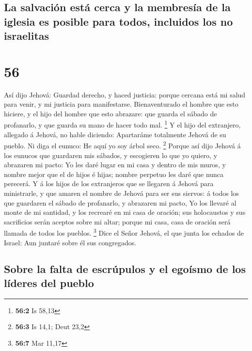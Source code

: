 \hypertarget{la-salvaciuxf3n-estuxe1-cerca-y-la-membresuxeda-de-la-iglesia-es-posible-para-todos-incluidos-los-no-israelitas}{%
\subsection{La salvación está cerca y la membresía de la iglesia es
posible para todos, incluidos los no
israelitas}\label{la-salvaciuxf3n-estuxe1-cerca-y-la-membresuxeda-de-la-iglesia-es-posible-para-todos-incluidos-los-no-israelitas}}

\hypertarget{section-55}{%
\section{56}\label{section-55}}

 Así dijo Jehová: Guardad derecho, y haced justicia:
porque cercana está mi salud para venir, y mi justicia para
manifestarse.  Bienaventurado el hombre que esto hiciere,
y el hijo del hombre que esto abrazare: que guarda el sábado de
profanarlo, y que guarda su mano de hacer todo mal. \footnote{\textbf{56:2}
  Is 58,13}  Y el hijo del extranjero, allegado á Jehová,
no hable diciendo: Apartaráme totalmente Jehová de su pueblo. Ni diga el
eunuco: He aquí yo soy árbol seco. \footnote{\textbf{56:3} Is 14,1; Deut
  23,2}  Porque así dijo Jehová á los eunucos que
guardaren mis sábados, y escogieren lo que yo quiero, y abrazaren mi
pacto:  Yo les daré lugar en mi casa y dentro de mis
muros, y nombre mejor que el de hijos é hijas; nombre perpetuo les daré
que nunca perecerá.  Y á los hijos de los extranjeros que
se llegaren á Jehová para ministrarle, y que amaren el nombre de Jehová
para ser sus siervos: á todos los que guardaren el sábado de profanarlo,
y abrazaren mi pacto,  Yo los llevaré al monte de mi
santidad, y los recrearé en mi casa de oración; sus holocaustos y sus
sacrificios serán aceptos sobre mi altar; porque mi casa, casa de
oración será llamada de todos los pueblos. \footnote{\textbf{56:7} Mar
  11,17}  Dice el Señor Jehová, el que junta los echados
de Israel: Aun juntaré sobre él sus congregados.

\hypertarget{sobre-la-falta-de-escruxfapulos-y-el-egouxedsmo-de-los-luxedderes-del-pueblo}{%
\subsection{Sobre la falta de escrúpulos y el egoísmo de los líderes del
pueblo}\label{sobre-la-falta-de-escruxfapulos-y-el-egouxedsmo-de-los-luxedderes-del-pueblo}}

